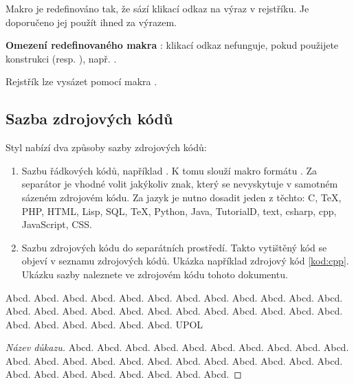\documentclass[
  biblatex,
  glossaries,
  index
]{kidiplom}
\begin{document}
Makro  je redefinováno tak, že sází klikací odkaz na výraz v rejstříku. Je doporučeno jej použít ihned za výrazem.

\textbf{Omezení redefinovaného makra }: klikací odkaz nefunguje, pokud použijete konstrukci  (resp. ), např. .

Rejstřík lze vysázet pomocí makra .

\subsection{Sazba zdrojových kódů}
Styl nabízí dva způsoby sazby zdrojových kódů:

\begin{enumerate}
  \item Sazbu řádkových kódů, například . K tomu slouží makro formátu . Za separátor je vhodné volit jakýkoliv znak, který se nevyskytuje v samotném sázeném zdrojovém kódu. Za jazyk je nutno dosadit jeden z těchto: C, TeX, PHP, HTML, Lisp, SQL, TeX, Python, Java, TutorialD, text, csharp, cpp, JavaScript, CSS.

  \item Sazbu zdrojových kódu do separátních prostředí. Takto vytištěný kód se objeví v seznamu zdrojových kódů. Ukázka například zdrojový kód \ref{kod:cpp}. Ukázku sazby naleznete ve zdrojovém kódu tohoto dokumentu.
\end{enumerate}


\begin{definition}
  Abcd. Abcd. Abcd. Abcd. Abcd. Abcd. Abcd. Abcd. Abcd. Abcd. Abcd. Abcd. Abcd. Abcd. Abcd. Abcd. Abcd. Abcd. Abcd. Abcd. Abcd. Abcd. Abcd. Abcd. Abcd. Abcd. Abcd. Abcd. Abcd. Abcd. \gls{UPOL}
\end{definition}

\begin{proof}[Název důkazu]
  Abcd. Abcd. Abcd. Abcd. Abcd. Abcd. Abcd. Abcd. Abcd. Abcd. Abcd. Abcd. Abcd. Abcd. Abcd. Abcd. Abcd. Abcd. Abcd. Abcd. Abcd. Abcd. Abcd. Abcd. Abcd. Abcd. Abcd. Abcd. Abcd. Abcd.
\end{proof}
\end{document}
